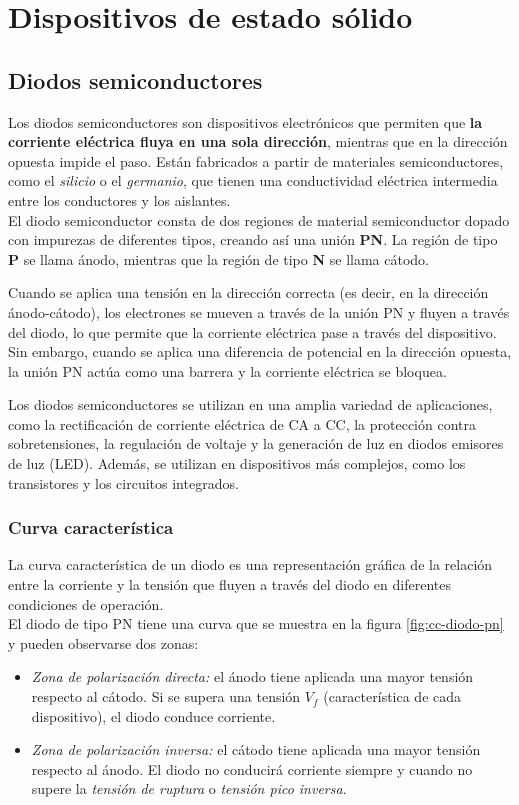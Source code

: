 \section{Dispositivos de estado sólido}
\subsection{Diodos semiconductores}

Los diodos semiconductores son dispositivos electrónicos que permiten que \textbf{la corriente eléctrica fluya en una sola dirección}, mientras que en la dirección opuesta impide el paso. Están fabricados a partir de materiales semiconductores, como el \textsl{silicio} o el \textsl{germanio}, que tienen una conductividad eléctrica intermedia entre los conductores y los aislantes.\\


El diodo semiconductor consta de dos regiones de material semiconductor dopado con impurezas de diferentes tipos, creando así una unión \textbf{PN}. La región de tipo \textbf{P} se llama ánodo, mientras que la región de tipo \textbf{N} se llama cátodo.

Cuando se aplica una tensión en la dirección correcta (es decir, en la dirección ánodo-cátodo), los electrones se mueven a través de la unión PN y fluyen a través del diodo, lo que permite que la corriente eléctrica pase a través del dispositivo. Sin embargo, cuando se aplica una diferencia de potencial en la dirección opuesta, la unión PN actúa como una barrera y la corriente eléctrica se bloquea.

Los diodos semiconductores se utilizan en una amplia variedad de aplicaciones, como la rectificación de corriente eléctrica de CA a CC, la protección contra sobretensiones, la regulación de voltaje y la generación de luz en diodos emisores de luz (LED). Además, se utilizan en dispositivos más complejos, como los transistores y los circuitos integrados.

\subsubsection{Curva característica}

La curva característica de un diodo es una representación gráfica de la relación entre la corriente y la tensión que fluyen a través del diodo en diferentes condiciones de operación.\\


El diodo de tipo PN tiene una curva que se muestra en la figura \ref{fig:cc-diodo-pn} y pueden observarse dos zonas:
\begin{itemize}
	\item \textsl{Zona de polarización directa:} el ánodo tiene aplicada una mayor tensión respecto al cátodo. Si se supera una tensión $V_f$ (característica de cada dispositivo), el diodo conduce corriente.
	\item \textsl{Zona de polarización inversa:} el cátodo tiene aplicada una mayor tensión respecto al ánodo. El diodo no conducirá corriente siempre y cuando no supere la \textsl{tensión de ruptura} o \textsl{tensión pico inversa}.
\end{itemize} 

